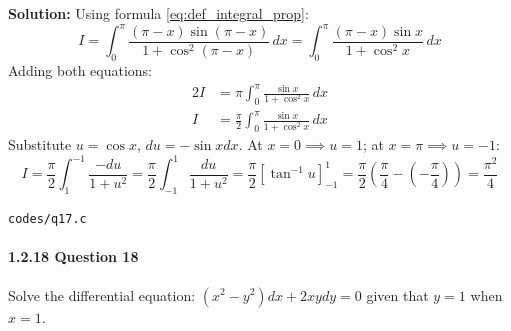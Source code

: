 \documentclass{article}
\begin{document}
\textbf{Solution:} Using formula \eqref{eq:def_integral_prop}:
\begin{equation}
I = \int_0^\pi \frac{(\pi - x)\sin(\pi - x)}{1 + \cos^2(\pi - x)} \, dx = \int_0^\pi \frac{(\pi - x)\sin x}{1 + \cos^2 x} \, dx
\end{equation}
Adding both equations:
\begin{align}
2I &= \pi \int_0^\pi \frac{\sin x}{1 + \cos^2 x} \, dx \\
I &= \frac{\pi}{2} \int_0^\pi \frac{\sin x}{1 + \cos^2 x} \, dx
\end{align}
Substitute $u = \cos x$, $du = -\sin x dx$. At $x = 0 \implies u = 1$; at $x = \pi \implies u = -1$:
\begin{equation}
I = \frac{\pi}{2} \int_1^{-1} \frac{-du}{1 + u^2} = \frac{\pi}{2} \int_{-1}^1 \frac{du}{1 + u^2} = \frac{\pi}{2} \left[ \tan^{-1} u \right]_{-1}^1 = \frac{\pi}{2} \left(\frac{\pi}{4} - \left(-\frac{\pi}{4}\right)\right) = \frac{\pi^2}{4}
\end{equation}
\begin{tcolorbox}[colback=gray!10,colframe=black,width=\linewidth]
\texttt{codes/q17.c}
\end{tcolorbox}

\paragraph{1.2.18 Question 18}
Solve the differential equation: $(x^2 - y^2)dx + 2xy dy = 0$ given that $y = 1$ when $x = 1$.
\end{document}
